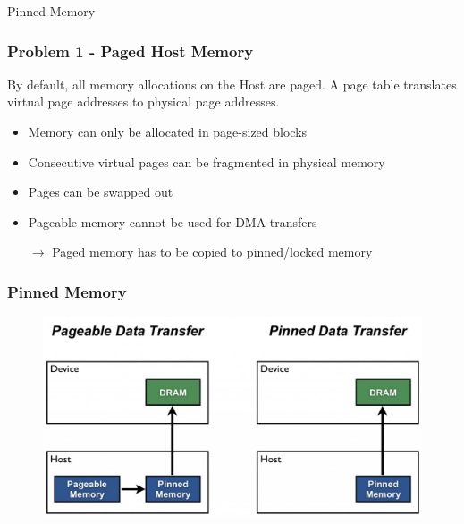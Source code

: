 \documentclass[aspectratio=169,handout]{beamer}
\begin{document}
\frame
{
\begin{center}
\Large Pinned Memory
\end{center}
}



\begin{frame}[fragile]
\frametitle{Problem 1 - Paged Host Memory}
By default, all memory allocations on the Host are paged. A page table translates virtual page addresses to physical page addresses.
\begin{itemize}
	\item Memory can only be allocated in page-sized blocks
	\item Consecutive virtual pages can be fragmented in physical memory
	\item Pages can be swapped out
	\item Pageable memory cannot be used for DMA transfers
	\item[$\rightarrow$] Paged memory has to be copied to pinned/locked memory
\end{itemize}

\end{frame}



\begin{frame}[fragile]
\frametitle{Pinned Memory}

		\begin{figure}
	\includegraphics[height=0.7\textheight]{pinnend}
\end{figure}

\end{frame}
\end{document}
